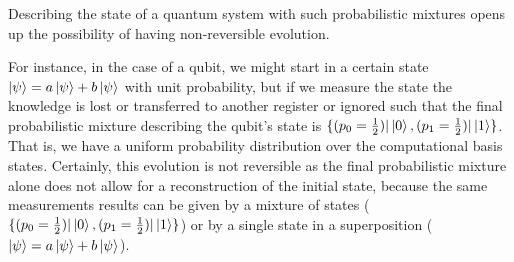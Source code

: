 Describing the state of a quantum system with such probabilistic mixtures opens up the possibility of having non-reversible evolution. 

For instance, in the case of a qubit, we might start in a certain state $\ket{\psi} = a\ket{\psi}+ b\ket{\psi}$ with unit probability, but if we measure the state the knowledge is lost or transferred to another register or ignored such that the final probabilistic mixture describing the qubit’s state is $\{(p_0=\frac{1}{2})|\ket{0}, (p_1=\frac{1}{2})|\ket{1}\}$. That is, we have a uniform probability distribution over the computational basis states. Certainly, this evolution is not reversible as the final probabilistic mixture alone does not allow for a reconstruction of the initial state, because the same measurements results can be given by a mixture of states ($\{(p_0=\frac{1}{2})|\ket{0}, (p_1=\frac{1}{2})|\ket{1}\}$) or by a single state in a superposition ($\ket{\psi} = a\ket{\psi}+ b\ket{\psi}$).


